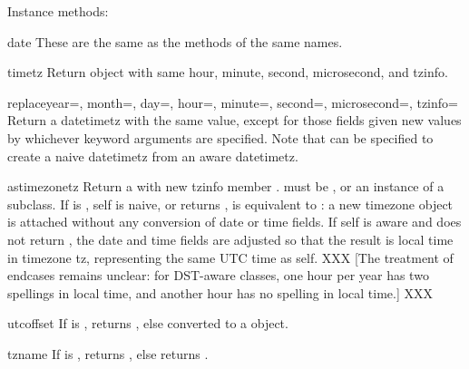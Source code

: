 Instance methods:

\begin{methoddesc}{date}{}
  These are the same as the  methods of the same names.
\end{methoddesc}

\begin{methoddesc}{timetz}{}
  Return  object with same hour, minute, second, microsecond,
  and tzinfo.
\end{methoddesc}

\begin{methoddesc}{replace}{year=, month=, day=, hour=, minute=, second=,
                            microsecond=, tzinfo=}
  Return a datetimetz with the same value, except for those fields given
  new values by whichever keyword arguments are specified.  Note that
   can be specified to create a naive datetimetz from
  an aware datetimetz.
\end{methoddesc}

\begin{methoddesc}{astimezone}{tz}
  Return a  with new tzinfo member .  
  must be , or an instance of a  subclass.  If
   is , self is naive, or
   returns ,
   is equivalent to
  :  a new timezone object is attached
  without any conversion of date or time fields.  If self is aware and
   does not return , the date and
  time fields are adjusted so that the result is local time in timezone
  tz, representing the same UTC time as self.
  XXX [The treatment of endcases remains unclear:  for DST-aware
  classes, one hour per year has two spellings in local time, and
  another hour has no spelling in local time.] XXX
\end{methoddesc}

\begin{methoddesc}{utcoffset}{}
  If  is , returns , else
   converted to a 
  object.
\end{methoddesc}

\begin{methoddesc}{tzname}{}
  If  is , returns , else
  returns .
\end{methoddesc}

